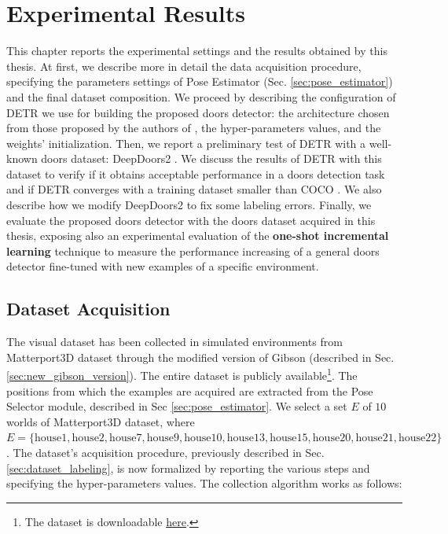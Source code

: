 \chapter{Experimental Results}
\label{sec:chapter5}
\thispagestyle{empty}

This chapter reports the experimental settings and the results obtained by this thesis. At first, we describe more in detail the data acquisition procedure, specifying the parameters settings of Pose Estimator (Sec. \ref{sec:pose_estimator}) and the final dataset composition. We proceed by describing the configuration of DETR we use for building the proposed doors detector: the architecture chosen from those proposed by the authors of \cite{detr}, the hyper-parameters values, and the weights' initialization. Then, we report a preliminary test of DETR with a well-known doors dataset: DeepDoors2 \cite{deepdoors2}. We discuss the results of DETR with this dataset to verify if it obtains acceptable performance in a doors detection task and if DETR converges with a training dataset smaller than COCO \cite{coco}. We also describe how we modify DeepDoors2  to fix some labeling errors. Finally, we evaluate the proposed doors detector with the doors dataset acquired in this thesis, exposing also an experimental evaluation of the \textbf{one-shot incremental learning} technique to measure the performance increasing of a general doors detector fine-tuned with new examples of a specific environment. 

\section{Dataset Acquisition}
\label{sec:dataset_acquisition}
The visual dataset has been collected in simulated environments from Matterport3D dataset \cite{matterport} through the modified version of Gibson \cite{gibson} (described in Sec. \ref{sec:new_gibson_version}). The entire dataset is publicly available\footnote{The dataset is downloadable \href{https://drive.google.com/file/d/1BqjBpobjKTomFjDkzhWjmCryAXOEluO2/view?usp=sharing}{here}.}. The positions from which the examples are acquired are extracted from the Pose Selector module, described in Sec \ref{sec:pose_estimator}. We select a set $E$ of $10$ worlds of Matterport3D dataset, where $E = \{\text{house1}, \text{house2}, \text{house7}, \text{house9}, \text{house10}, \text{house13}, \text{house15}, \text{house20},  \text{house21},  \text{house22}\}$. The dataset's acquisition procedure, previously described in Sec. \ref{sec:dataset_labeling}, is now formalized by reporting the various steps and specifying the hyper-parameters values. The collection algorithm works as follows:

